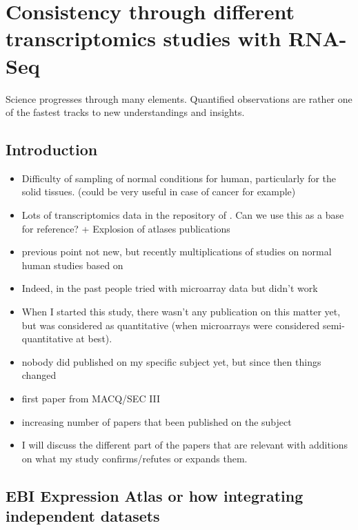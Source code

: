 \chapter{Consistency through different transcriptomics studies with RNA-Seq}
\label{ch:Transcriptomics}



Science progresses through many elements. Quantified observations are rather one
of the fastest tracks to new understandings and insights.

\section{Introduction}

\begin{itemize}
    \item Difficulty of sampling of normal conditions for human, particularly
        for the solid tissues. (could be very useful in case of cancer for
        example)
    \item Lots of transcriptomics data in the repository of \EBI{}. Can we use
        this as a base for reference? + Explosion of atlases publications
    \item previous point not new, but recently multiplications of studies on
        normal human studies based on \Rnaseq
    \item Indeed, in the past people tried with microarray data but didn't work
    \item When I started this study, there wasn't any publication on this matter
        yet, but \Rnaseq was considered as quantitative (when microarrays were
        considered semi-quantitative at best).
    \item nobody did published on my specific subject yet, but since then things changed
    \item first paper from MACQ/SEC III
    \item increasing number of papers that been published on the subject
    \item I will discuss the different part of the papers that are relevant
        with additions on what my study confirms/refutes or expands them.
\end{itemize}
\section{EBI Expression Atlas or how integrating independent datasets }


